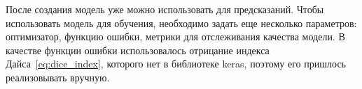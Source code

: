 После создания модель уже можно использовать для предсказаний. Чтобы использовать модель для обучения, необходимо задать еще несколько параметров: оптимизатор, функцию ошибки, метрики для отслеживания качества модели. В качестве функции ошибки использовалось отрицание индекса Дайса~\eqref{eq:dice_index}, которого нет в библиотеке keras, поэтому его пришлось реализовывать вручную.

